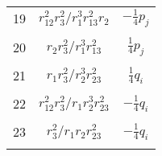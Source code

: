 \documentclass[Dissertation.tex]{subfiles}
\begin{document}
\begin{center}
\begin{longtable}{|c|c|c|}
19  & $r_{12}^2 r_3^2/r_1^3 r_{13}^2 r_2$  & $-\frac{1}{4}p_j$ \\
&  &  \\
20  & $r_2 r_3^2/r_1^3 r_{13}^2$  & $\frac{1}{4}p_j$ \\
&  &  \\
21  & $r_1 r_3^2/r_2^3 r_{23}^2$  & $\frac{1}{4}q_i$ \\
&  &  \\
22  & $r_{12}^2 r_3^2/r_1 r_2^3 r_{23}^2$  & $-\frac{1}{4}q_i$ \\
&  &  \\
23  & $r_3^2/r_1 r_2 r_{23}^2$  & $-\frac{1}{4}q_i$ \\
&  &  \\
\end{longtable}
\end{center}
\end{document}

